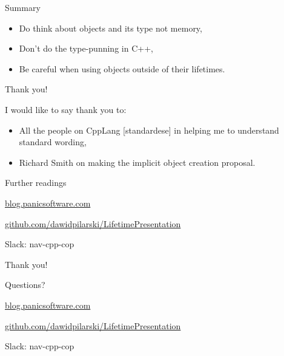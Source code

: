 \documentclass{panicsoftware-presentation}
\makeatletter
\newenvironment{itemizeSeq}{\begin{itemize}[<+-|alert@+>]}{\end{itemize}}
\makeatother
\begin{document}
\begin{frame}{Summary}

\begin{itemizeSeq}
\item Do think about objects and its type not memory,
\item Don't do the type-punning in C++,
\item Be careful when using objects outside of their lifetimes. 
\end{itemizeSeq}

\end{frame}

\begin{frame}{Thank you!}

I would like to say thank you to:

\begin{itemize}
\item All the people on CppLang [standardese] in helping me to understand standard wording,
\item Richard Smith on making the implicit object creation proposal.
\end{itemize}

\end{frame}


\begin{frame}{Further readings}

\vfill

\centerline{\alert{\href{http://blog.panicsoftware.com}{blog.panicsoftware.com}}}

\pause
\vfill

\centerline{\alert{\href{https://github.com/dawidpilarski/LifetimePresentation}{github.com/dawidpilarski/LifetimePresentation}}}

\pause
\vfill


\centerline{\alert{Slack: nav-cpp-cop}}

\vfill

\end{frame}

\begin{frame}{Thank you!}

\centerline{Questions?}

\vfill

\centerline{\alert{\href{http://blog.panicsoftware.com}{blog.panicsoftware.com}}}
\centerline{\alert{\href{https://github.com/dawidpilarski/LifetimePresentation}{github.com/dawidpilarski/LifetimePresentation}}}
\centerline{\alert{Slack: nav-cpp-cop}}
\end{frame}
\end{document}
